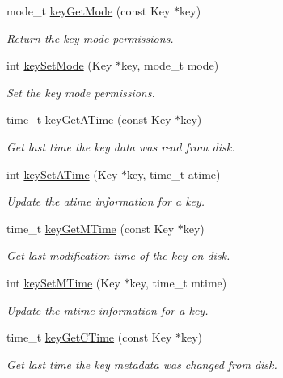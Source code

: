 \begin{DoxyCompactItemize}
mode\-\_\-t \hyperlink{group__meta_gabc0cec592ce3b77e9bc33dbc8e8f6bdc}{key\-Get\-Mode} (const Key $\ast$key)
\begin{DoxyCompactList}\small\item\em Return the key mode permissions. \end{DoxyCompactList}\item 
int \hyperlink{group__meta_ga8803037e35b9da1ce492323a88ff6bc3}{key\-Set\-Mode} (Key $\ast$key, mode\-\_\-t mode)
\begin{DoxyCompactList}\small\item\em Set the key mode permissions. \end{DoxyCompactList}\item 
time\-\_\-t \hyperlink{group__meta_ga6b05da399c3c78904969ef39f191b0eb}{key\-Get\-A\-Time} (const Key $\ast$key)
\begin{DoxyCompactList}\small\item\em Get last time the key data was read from disk. \end{DoxyCompactList}\item 
int \hyperlink{group__meta_ga995d8b84731673c88c7c01f3fed538b9}{key\-Set\-A\-Time} (Key $\ast$key, time\-\_\-t atime)
\begin{DoxyCompactList}\small\item\em Update the atime information for a key. \end{DoxyCompactList}\item 
time\-\_\-t \hyperlink{group__meta_ga57689eb5691679071463b777ae786ae9}{key\-Get\-M\-Time} (const Key $\ast$key)
\begin{DoxyCompactList}\small\item\em Get last modification time of the key on disk. \end{DoxyCompactList}\item 
int \hyperlink{group__meta_ga481d8997187992fe4bbf288bc8ef4db7}{key\-Set\-M\-Time} (Key $\ast$key, time\-\_\-t mtime)
\begin{DoxyCompactList}\small\item\em Update the mtime information for a key. \end{DoxyCompactList}\item 
time\-\_\-t \hyperlink{group__meta_ga2c213c120cbe02201278ef7fb8cd94be}{key\-Get\-C\-Time} (const Key $\ast$key)
\begin{DoxyCompactList}\small\item\em Get last time the key metadata was changed from disk. \end{DoxyCompactList}\item 

\end{DoxyCompactItemize}
